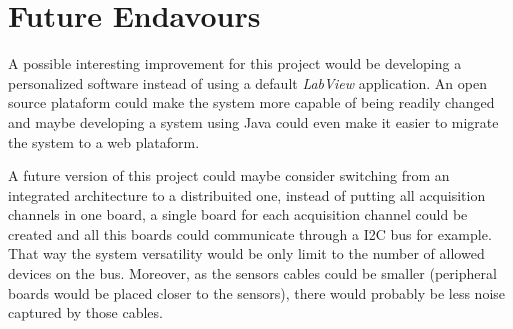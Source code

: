 	\section{Future Endavours}\label{sec:future-endavours}
		A possible interesting improvement for this project would be developing a personalized software instead of using a default \textit{LabView} application. An open source plataform could make the system more capable of being readily changed and maybe developing a system using Java could even make it easier to migrate the system to a web plataform.
		\par
		A future version of this project could maybe consider switching from an integrated architecture to a distribuited one, instead of putting all acquisition channels in one board, a single board for each acquisition channel could be created and all this boards could communicate through a I2C bus for example. That way the system versatility would be only limit to the number of allowed devices on the bus. Moreover, as the sensors cables could be smaller (peripheral boards would be placed closer to the sensors), there would probably be less noise captured by those cables.

